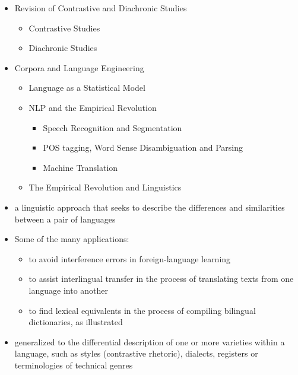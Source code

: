 \documentclass[a4paper,landscape,headrule,footrule,xetex]{foils}
\begin{document}

\maketitle



\begin{itemize} 
\item Revision of Contrastive and Diachronic Studies
  \begin{itemize} 
  \item Contrastive Studies
  \item Diachronic Studies
  \end{itemize}
\item Corpora and Language Engineering
  \begin{itemize}
  \item Language as a Statistical Model
  \item NLP and the Empirical Revolution
    \begin{itemize}
    \item Speech Recognition and Segmentation
    \item POS tagging, Word Sense Disambiguation and Parsing
    \item Machine Translation
    \end{itemize}
  \item The Empirical Revolution and Linguistics
  \end{itemize}
\end{itemize}




\begin{itemize}
\item  a linguistic approach that seeks to describe the differences and similarities between a pair of languages
\item Some of the many applications:
  \begin{itemize}
  \item to avoid interference errors in foreign-language learning
  \item to assist interlingual transfer in the process of translating texts from one language into another
  \item to find lexical equivalents in the process of compiling bilingual dictionaries, as illustrated
  \end{itemize}
\item generalized to the differential description of one or more varieties within a language, such as styles (contrastive rhetoric), dialects, registers or terminologies of technical genres
\end{itemize}
\end{document}
